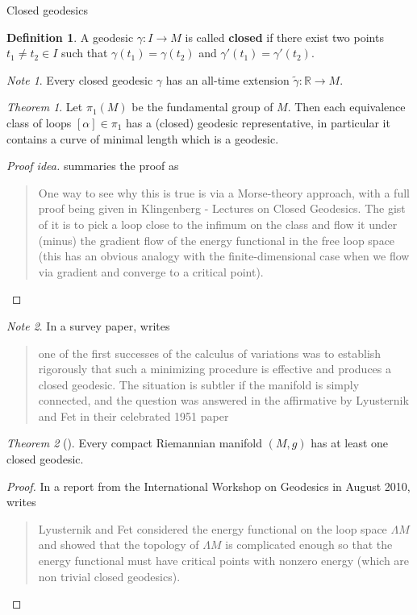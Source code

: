 \documentclass{article}
\newcommand{\fn}[3]{#1 \colon #2 \rightarrow #3}
\theoremstyle{definition}
\newtheorem{definition}{Definition}[section]
\theoremstyle{remark}
\newtheorem{remark}{Note}[section]
\newtheorem{theorem}{Theorem}[section]
\begin{document}
\begin{section}{Closed geodesics}
  \begin{definition}
    A geodesic $\fn \gamma I M$ is called \textbf{closed} if there exist
    two points $t_1 \neq t_2 \in I$ such that $\gamma(t_1) = \gamma(t_2)$ and
    $\gamma'(t_1) = \gamma'(t_2)$.
  \end{definition}
  \begin{remark}
    Every closed geodesic $\gamma$ has an all-time extension $\fn {\widetilde\gamma} {\mathbb R} {M}$.
  \end{remark}
  \begin{theorem}
    Let $\pi_1(M)$ be the fundamental group of $M$. Then each equivalence class
    of loops $[\alpha] \in \pi_1$ has a (closed) geodesic representative, in
    particular it contains a curve of minimal length which is a geodesic.
  \end{theorem}
  \begin{proof}[Proof idea]
    \cite{Macedo} summaries the proof as \begin{quote}
      One way to see why this is true is via a Morse-theory approach, with a
      full proof being given in Klingenberg - Lectures on Closed Geodesics. The
      gist of it is to pick a loop close to the infimum on the class and flow it
      under (minus) the gradient flow of the energy functional in the free loop
      space (this has an obvious analogy with the finite-dimensional case when
      we flow via gradient and converge to a critical point).
    \end{quote}
  \end{proof}

  \begin{remark}
  In a survey paper, \cite{Oancea} writes
    \begin{quote}
      one of the first successes of the calculus of variations was to establish
      rigorously that such a minimizing procedure is effective and produces a
      closed geodesic. The situation is subtler if the manifold is simply
      connected, and the question was answered in the affirmative by Lyusternik
      and Fet in their celebrated 1951 paper
    \end{quote}
  \end{remark}

  \begin{theorem}[\cite{Lyusternik}]
    Every compact Riemannian manifold $(M, g)$ has at least one closed geodesic.
  \end{theorem}
  \begin{proof}
    In a report from the International Workshop on Geodesics in August 2010,
    \cite{Burns} writes \begin{quote}
      Lyusternik and Fet considered the energy functional on the loop space $\Lambda M$ and
      showed that the topology of $\Lambda M$ is complicated enough so that the
      energy functional must have critical points with nonzero energy (which are
      non trivial closed geodesics).
    \end{quote}
  \end{proof}


\end{section}
\end{document}
